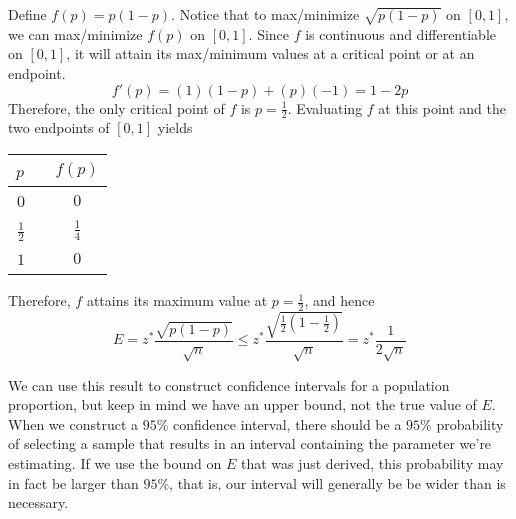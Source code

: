 \begin{pf} Define $f(p) = p(1-p)$. Notice that to max/minimize $\sqrt{p(1-p)}$ on $[0,1]$, we can max/minimize $f(p)$ on $[0,1]$. Since $f$ is continuous and differentiable on $[0,1]$, it will attain its max/minimum values at a critical point or at an endpoint.
$$f'(p) = (1)(1-p) + (p)(-1) = 1 - 2p$$
Therefore, the only critical point of $f$ is $p = \frac{1}{2}$. Evaluating $f$ at this point and the two endpoints of $[0,1]$ yields
\vspace*{-0.1in}
\begin{center}
\def\arraystretch{1.5}%
\begin{tabular}{c|c}
$p$ \ & $f(p)$ \\
\hline
$0$ \ & $0$ \\
$\frac{1}{2}$ \ & $\frac{1}{4}$ \\
$1$ \ & $0$ \\
\end{tabular}
\end{center}
\vspace*{-0.05in}
Therefore, $f$ attains its maximum value at $p = \frac{1}{2}$, and hence
$$E = z^*   \frac{\sqrt{p(1-p)}}{\sqrt{n}} \leq z^*  \frac{\sqrt{\frac{1}{2}(1 -\frac{1}{2})}}{\sqrt{n}} = z^*  \frac{1}{2\sqrt{n}}$$
\end{pf}
\par
We can use this result to construct confidence intervals for a population proportion, but keep in mind we have an upper bound, not the true value of $E$. When we construct a $95\%$ confidence interval, there should be a $95\%$ probability of selecting a sample that results in an interval containing the parameter we're estimating. If we use the bound on $E$ that was just derived, this probability may in fact be larger than $95\%$, that is, our interval will generally be be wider than is necessary.
\par
